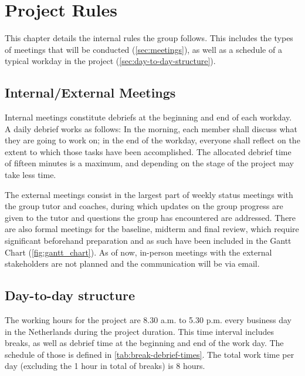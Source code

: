 \chapter{Project Rules}
This chapter details the internal rules the group follows. This includes the types of meetings that will be conducted (\autoref{sec:meetings}), as well as a schedule of a typical workday in the project (\autoref{sec:day-to-day-structure}).

\section{Internal/External Meetings}
\label{sec:meetings}
Internal meetings constitute debriefs at the beginning and end of each workday. A daily debrief works as follows: In the morning, each member shall discuss what they are going to work on; in the end of the workday, everyone shall reflect on the extent to which those tasks have been accomplished. The allocated debrief time of fifteen minutes is a maximum, and depending on the stage of the project  may take less time.

The external meetings consist in the largest part of weekly status meetings with the group tutor and coaches, during which updates on the group progress are given to the tutor and questions the group has encountered are addressed. There are also formal meetings for the baseline, midterm and final review, which require significant beforehand preparation and as such have been included in the Gantt Chart (\autoref{fig:gantt_chart}). As of now, in-person meetings with the external stakeholders are not planned and the communication will be via email.

\section{Day-to-day structure}
\label{sec:day-to-day-structure}
The working hours for the project are 8.30 a.m. to 5.30 p.m. every business day in the Netherlands during the project duration. This time interval includes breaks, as well as debrief time at the beginning and end of the work day. The schedule of those is defined in \autoref{tab:break-debrief-times}. The total work time per day (excluding the 1 hour in total of breaks) is 8 hours.




